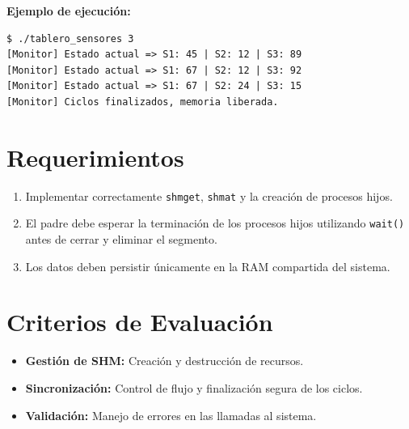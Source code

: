 \documentclass[12pt,a4paper]{article}
\begin{document}
\textbf{Ejemplo de ejecución:} 
\begin{lstlisting}[numbers=none]
$ ./tablero_sensores 3
[Monitor] Estado actual => S1: 45 | S2: 12 | S3: 89
[Monitor] Estado actual => S1: 67 | S2: 12 | S3: 92
[Monitor] Estado actual => S1: 67 | S2: 24 | S3: 15
[Monitor] Ciclos finalizados, memoria liberada.
\end{lstlisting}

\section*{Requerimientos}
\begin{enumerate}
    \item Implementar correctamente \texttt{shmget}, \texttt{shmat} y la creación de procesos hijos.
    \item El padre debe esperar la terminación de los procesos hijos utilizando \texttt{wait()} antes de cerrar y eliminar el segmento.
    \item Los datos deben persistir únicamente en la RAM compartida del sistema.
\end{enumerate}

\section*{Criterios de Evaluación}
\begin{itemize}
    \item \textbf{Gestión de SHM:} Creación y destrucción de recursos.
    \item \textbf{Sincronización:} Control de flujo y finalización segura de los ciclos.
    \item \textbf{Validación:} Manejo de errores en las llamadas al sistema.
\end{itemize}
\end{document}
